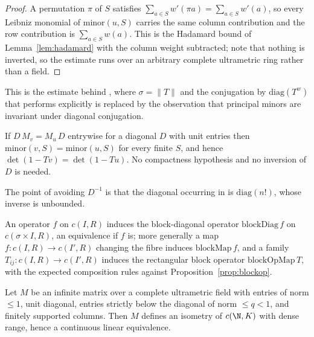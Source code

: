 \begin{proof}
  \leanok
  A permutation $\pi$ of $S$ satisfies $\sum_{a\in S} w'(\pi a) = \sum_{a \in S} w'(a)$, so every
  Leibniz monomial of $\mathrm{minor}(u,S)$ carries the same column contribution and the row
  contribution is $\sum_{a\in S}w(a)$.  This is the Hadamard bound of Lemma~\ref{lem:hadamard}
  with the column weight subtracted; note that nothing is inverted, so the estimate runs over an
  arbitrary complete ultrametric ring rather than a field.
\end{proof}

This is the estimate behind \cite[Theorem 3.16]{LWX}, where $\sigma = \lVert T\rVert$ and the
conjugation by $\mathrm{diag}(T^{w})$ that \cite{LWX} performs explicitly is replaced by the
observation that principal minors are invariant under diagonal conjugation.

\begin{lemma}
  \label{lem:diag-intertwine}
  \leanok
  If $D\,M_v = M_u\,D$ entrywise for a diagonal $D$ with unit entries then
  $\mathrm{minor}(v,S) = \mathrm{minor}(u,S)$ for every finite $S$, and hence
  $\det(1-Tv) = \det(1-Tu)$.  No compactness hypothesis and no inversion of $D$ is needed.
\end{lemma}

The point of avoiding $D^{-1}$ is that the diagonal occurring in \cite[Proposition 2.17]{LWX} is
$\mathrm{diag}(n!)$, whose inverse is unbounded.

\begin{definition}
  \label{def:blockmaps}
  \leanok
  An operator $f$ on $c(I,R)$ induces the block-diagonal operator $\mathrm{blockDiag}\,f$ on
  $c(\sigma\times I, R)$, an equivalence if $f$ is; more generally a map
  $f : c(I,R) \to c(I',R)$ changing the fibre induces $\mathrm{blockMap}\,f$, and a family
  $T_{ij} : c(I,R)\to c(I',R)$ induces the rectangular block operator
  $\mathrm{blockOpMap}\,T$, with the expected composition rules against
  Proposition~\ref{prop:blockop}.
\end{definition}

\begin{theorem}
  \label{thm:unitriangular}
  \leanok
  Let $M$ be an infinite matrix over a complete ultrametric field with entries of norm
  $\leq 1$, unit diagonal, entries strictly below the diagonal of norm $\leq q < 1$, and
  finitely supported columns.  Then $M$ defines an isometry of $c(\N,K)$ with dense range, hence
  a continuous linear equivalence.
\end{theorem}

